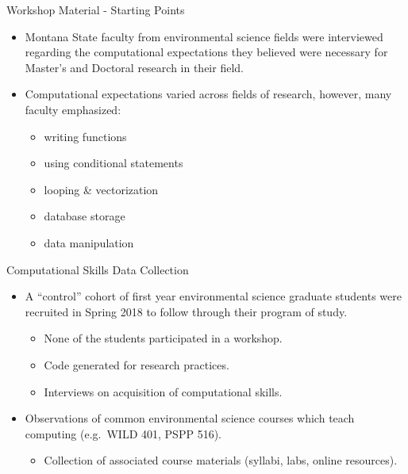 \documentclass[10pt,ignorenonframetext,]{beamer}
\providecommand{\tightlist}{%
  \setlength{\itemsep}{0pt}\setlength{\parskip}{0pt}}
\begin{document}
\begin{frame}{Workshop Material - Starting Points}

\begin{itemize}[<+->]
\item
  Montana State faculty from environmental science fields were
  interviewed regarding the computational expectations they believed
  were necessary for Master's and Doctoral research in their field.
\item
  Computational expectations varied across fields of research, however,
  many faculty emphasized:

  \begin{itemize}[<+->]
  \tightlist
  \item
    writing functions\\
  \item
    using conditional statements\\
  \item
    looping \& vectorization\\
  \item
    database storage\\
  \item
    data manipulation
  \end{itemize}
\end{itemize}

\end{frame}

\begin{frame}{Computational Skills Data Collection}

\begin{itemize}[<+->]
\tightlist
\item
  A ``control'' cohort of first year environmental science graduate
  students were recruited in Spring 2018 to follow through their program
  of study.

  \begin{itemize}[<+->]
  \tightlist
  \item
    None of the students participated in a workshop.
  \item
    Code generated for research practices.
  \item
    Interviews on acquisition of computational skills.
  \end{itemize}
\end{itemize}

\begin{itemize}[<+->]
\tightlist
\item
  Observations of common environmental science courses which teach
  computing (e.g.~WILD 401, PSPP 516).

  \begin{itemize}[<+->]
  \tightlist
  \item
    Collection of associated course materials (syllabi, labs, online
    resources).
  \end{itemize}
\end{itemize}

\end{frame}
\end{document}
